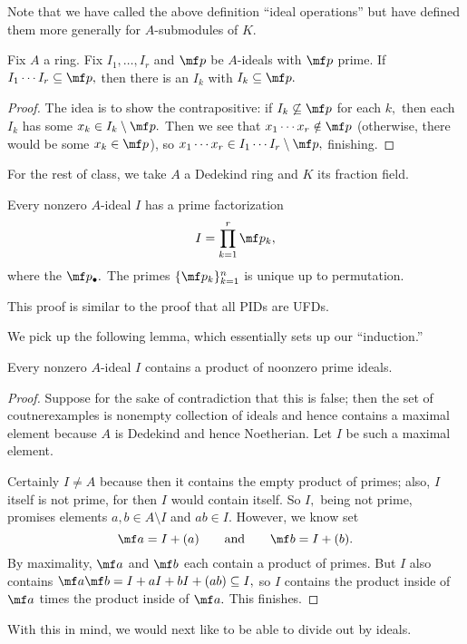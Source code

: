 Note that we have called the above definition ``ideal operations'' but have defined them more generally for $A$-submodules of $K.$
\begin{lem}
    Fix $A$ a ring. Fix $I_1,\ldots,I_r$ and $\mf p$ be $A$-ideals with $\mf p$ prime. If $I_1\cdots I_r\subseteq\mf p,$ then there is an $I_k$ with $I_k\subseteq\mf p.$
\end{lem}
\begin{proof}
    The idea is to show the contrapositive: if $I_k\not\subseteq\mf p$ for each $k,$ then each $I_k$ has some $x_k\in I_k\setminus\mf p.$ Then we see that $x_1\cdots x_r\notin\mf p$ (otherwise, there would be some $x_k\in\mf p$), so $x_1\cdots x_r\in I_1\cdots I_r\setminus\mf p,$ finishing.
\end{proof}
For the rest of class, we take $A$ a Dedekind ring and $K$ its fraction field.
\begin{thm}
    Every nonzero $A$-ideal $I$ has a prime factorization
    \[I=\prod_{k=1}^r\mf p_k,\]
    where the $\mf p_\bullet.$ The primes $\{\mf p_k\}_{k=1}^n$ is unique up to permutation.
\end{thm}
\begin{remark}
    This proof is similar to the proof that all PIDs are UFDs.
\end{remark}
We pick up the following lemma, which essentially sets up our ``induction.''
\begin{lem}
    Every nonzero $A$-ideal $I$ contains a product of noonzero prime ideals.
\end{lem}
\begin{proof}
    Suppose for the sake of contradiction that this is false; then the set of coutnerexamples is nonempty collection of ideals and hence contains a maximal element because $A$ is Dedekind and hence Noetherian. Let $I$ be such a maximal element.
    
    Certainly $I\ne A$ because then it contains the empty product of primes; also, $I$ itself is not prime, for then $I$ would contain itself. So $I,$ being not prime, promises elements $a,b\in A\setminus I$ and $ab\in I.$ However, we know set
    \[\mf a=I+(a)\qquad\text{and}\qquad\mf b=I+(b).\]
    By maximality, $\mf a$ and $\mf b$ each contain a product of primes. But $I$ also contains $\mf a\mf b=I+aI+bI+(ab)\subseteq I,$ so $I$ contains the product inside of $\mf a$ times the product inside of $\mf a.$ This finishes.
\end{proof}
With this in mind, we would next like to be able to divide out by ideals.
